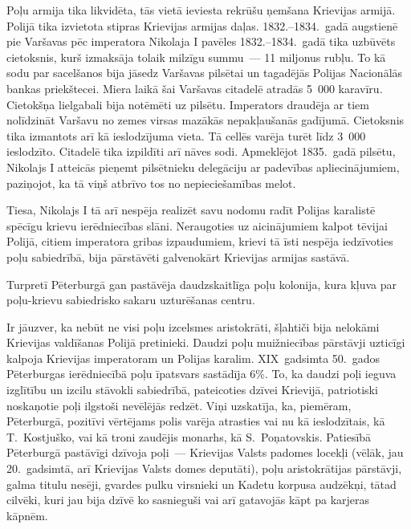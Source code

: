 \documentclass[twoside,a5paper,12pt,fleqn,openany]{extbook}
\begin{document}
Poļu armija tika likvidēta, tās vietā ieviesta rekrūšu ņemšana Krievijas armijā. Polijā tika izvietota stipras Krievijas armijas daļas. 1832.--1834.~gadā augstienē pie Varšavas pēc imperatora Nikolaja I pavēles 1832.--1834.~gadā tika uzbūvēts cietoksnis, kurš izmaksāja tolaik milzīgu summu~--- 11 miljonus rubļu. To kā sodu par sacelšanos bija jāsedz Varšavas pilsētai un tagadējās Polijas Nacionālās bankas priekštecei. Miera laikā šai Varšavas citadelē atradās 5~000 karavīru. Cietokšņa lielgabali bija notēmēti uz pilsētu. Imperators draudēja ar tiem nolīdzināt Varšavu no zemes virsas mazākās nepakļaušanās gadījumā. Cietoksnis tika izmantots arī kā ieslodzījuma vieta. Tā cellēs varēja turēt līdz 3~000 ieslodzīto. Citadelē tika izpildīti arī nāves sodi. Apmeklējot 1835.~gadā pilsētu, Nikolajs I atteicās pieņemt pilsētnieku delegāciju ar padevības apliecinājumiem, paziņojot, ka tā viņš atbrīvo tos no nepieciešamības melot.

Tiesa, Nikolajs I tā arī nespēja realizēt savu nodomu radīt Polijas karalistē spēcīgu krievu ierēdniecības slāni. Neraugoties uz aicinājumiem kalpot tēvijai Polijā, citiem imperatora gribas izpaudumiem, krievi tā īsti nespēja iedzīvoties poļu sabiedrībā, bija pārstāvēti galvenokārt Krievijas armijas sastāvā.

Turpretī Pēterburgā gan pastāvēja daudzskaitlīga poļu kolonija, kura kļuva par poļu-krievu sabiedrisko sakaru uzturēšanas centru.

Ir jāuzver, ka nebūt ne visi poļu izcelsmes aristokrāti, šļahtiči bija nelokāmi Krievijas valdīšanas Polijā pretinieki. Daudzi poļu muižniecības pārstāvji uzticīgi kalpoja Krievijas imperatoram un Polijas karalim. XIX~gadsimta 50.~gados Pēterburgas ierēdniecībā poļu īpatsvars sastādīja 6\%. To, ka daudzi poļi ieguva izglītību un izcilu stāvokli sabiedrībā, pateicoties dzīvei Krievijā, patriotiski noskaņotie poļi ilgstoši nevēlējās redzēt. Viņi uzskatīja, ka, piemēram, Pēterburgā, pozitīvi vērtējams polis varēja atrasties vai nu kā ieslodzītais, kā T.~Kostjuško, vai kā troni zaudējis monarhs, kā S.~Poņatovskis. Patiesībā Pēterburgā pastāvīgi dzīvoja poļi~--- Krievijas Valsts padomes locekļi (vēlāk, jau 20.~gadsimtā, arī Krievijas Valsts domes deputāti), poļu aristokrātijas pārstāvji, galma titulu nesēji, gvardes pulku virsnieki un Kadetu korpusa audzēkņi, tātad cilvēki, kuri jau bija dzīvē ko sasnieguši vai arī gatavojās kāpt pa karjeras kāpnēm.
\end{document}
